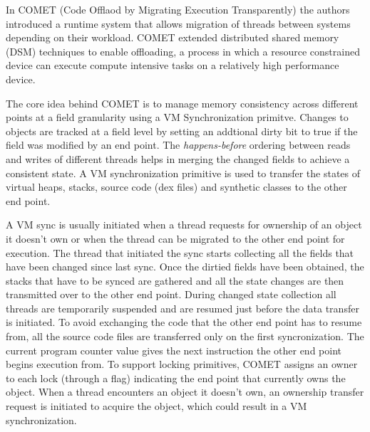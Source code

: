 In COMET (Code Offlaod by Migrating Execution Transparently) \cite{comet} 
the authors introduced a runtime system that allows migration of threads 
between systems depending on their workload. COMET extended distributed 
shared memory (DSM) techniques to enable offloading, a process in which
a resource constrained device can execute compute intensive tasks on a 
relatively high performance device. 

The core idea behind COMET is to manage memory consistency across different
points at a field 
granularity using a VM Synchronization primitve. Changes to objects are 
tracked at a field level by setting an addtional dirty bit to true if the 
field was modified by an end point. The \textit{happens-before} ordering 
between reads and writes of different threads helps in merging the changed 
fields to achieve a consistent state. A VM synchronization primitive is used 
to transfer the states of virtual heaps, stacks, source code (dex files) and 
synthetic classes to the other end point. 


A VM sync is usually initiated when a thread requests for ownership of 
an object it doesn't own or when the thread can be migrated to the other 
end point for execution. The thread that initiated the sync starts 
collecting all the fields that have been changed since last sync. Once the 
dirtied fields have been obtained, the stacks that have to be synced are 
gathered and all the state changes are then transmitted over to the other 
end point. During changed state collection all threads are temporarily suspended
and are resumed just before the data transfer is initiated. To avoid exchanging
the code that the other end point has to resume from, all the source code files are 
transferred only on the first syncronization. The current program counter value 
gives the next instruction the other end point begins execution from. To support 
locking primitives, COMET assigns an owner to each lock (through a flag) 
indicating the end point that currently owns the object. When a thread 
encounters an object it doesn't own, an ownership transfer request is 
initiated to acquire the object, which could result in a VM synchronization. 



